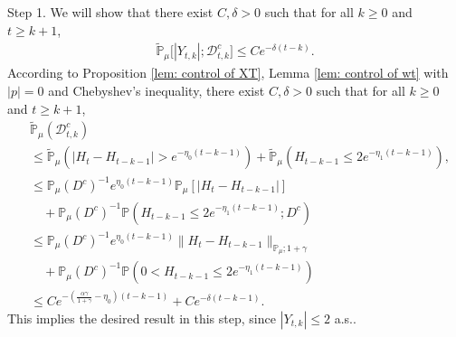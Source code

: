 \documentclass[12pt,a4paper]{amsart}
\theoremstyle{plain}
\theoremstyle{definition}
\numberwithin{equation}{section}
\begin{document}
    Step 1. We will show that there exist $C,\delta >0$ such that for all $k \geq 0$ and $t\geq k+1$,
\begin{equation}\begin{split}
\label{thm121}
    \mathbb{\tilde{P}}_{\mu}\big[|Y_{t,k}|;\mathcal{D}^c_{t,k}\big]
    \leq C e^{-\delta (t-k)}.
\end{split}\end{equation}
    According to Proposition \ref{lem: control of XT}, Lemma \ref{lem: control of wt} with $|p|=0$ and Chebyshev's inequality, there exist $C, \delta>0$ such that for all $k \geq 0$ and $t\geq k+1$,
\begin{equation}\begin{split}
\label{eq: prob of Dtkc}
    &\mathbb{\tilde{P}}_{\mu}(\mathcal{D}_{t,k}^c)
    \\&\leq \mathbb{\tilde{P}}_{\mu}(|H_t-H_{t-k-1}| > e^{-\eta_0 (t-k-1)})+\mathbb{\tilde{P}}_{\mu}(H_{t-k-1}\leq 2e^{-\eta_1(t-k-1)}),
    \\&\leq \mathbb{P}_{\mu}(D^c)^{-1}e^{\eta_0(t-k-1)}\mathbb{P}_{\mu}[|H_t-H_{t-k-1}|]
    \\&\quad +\mathbb{P}_{\mu}(D^c)^{-1} \mathbb P(H_{t-k-1}\leq 2e^{-\eta_1(t-k-1)}; D^c)
    \\&\leq \mathbb{P}_{\mu}(D^c)^{-1}  e^{\eta_0(t-k-1)}\|H_t - H_{t-k-1}\|_{\mathbb P_\mu; 1+\gamma}
    \\&\quad + \mathbb{P}_{\mu}(D^c)^{-1} \mathbb P(0<H_{t-k-1}\leq 2e^{-\eta_1(t-k-1)})
    \\&\leq C e^{-(\frac{\alpha \gamma}{1+\gamma} - \eta_0)(t-k-1)}+C e^{-\delta(t-k-1)}.
\end{split}\end{equation}
    This implies the desired result in this step, since $|Y_{t,k}| \leq 2$ a.s..
\end{document}
